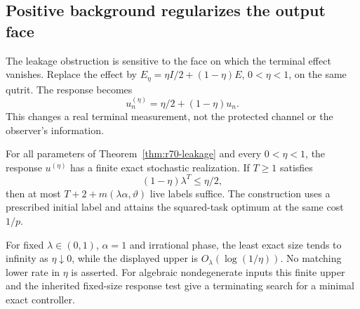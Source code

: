 \subsection{Positive background regularizes the output face}
The leakage obstruction is sensitive to the face on which the terminal effect vanishes. Replace the effect by
$E_\eta=\eta I/2+(1-\eta)E$, $0<\eta<1$, on the same qutrit. The response becomes
\[
 u_n^{(\eta)}=\eta/2+(1-\eta)u_n.
\]
This changes a real terminal measurement, not the protected channel or the observer's information.

\begin{theorem}\label{thm:r70-background}
For all parameters of Theorem~\ref{thm:r70-leakage} and every $0<\eta<1$, the response $u^{(\eta)}$ has a finite exact stochastic realization. If $T\ge1$ satisfies
\begin{equation}\label{eq:r70-background-depth}
 (1-\eta)\lambda^T\le\eta/2,
\end{equation}
then at most $T+2+m(\lambda\alpha,\vartheta)$ live labels suffice. The construction uses a prescribed initial label and attains the squared-task optimum at the same cost $1/p$.

For fixed $\lambda\in(0,1)$, $\alpha=1$ and irrational phase, the least exact size tends to infinity as $\eta\downarrow0$, while the displayed upper is $O_\lambda(\log(1/\eta))$. No matching lower rate in $\eta$ is asserted. For algebraic nondegenerate inputs this finite upper and the inherited fixed-size response test give a terminating search for a minimal exact controller.
\end{theorem}
